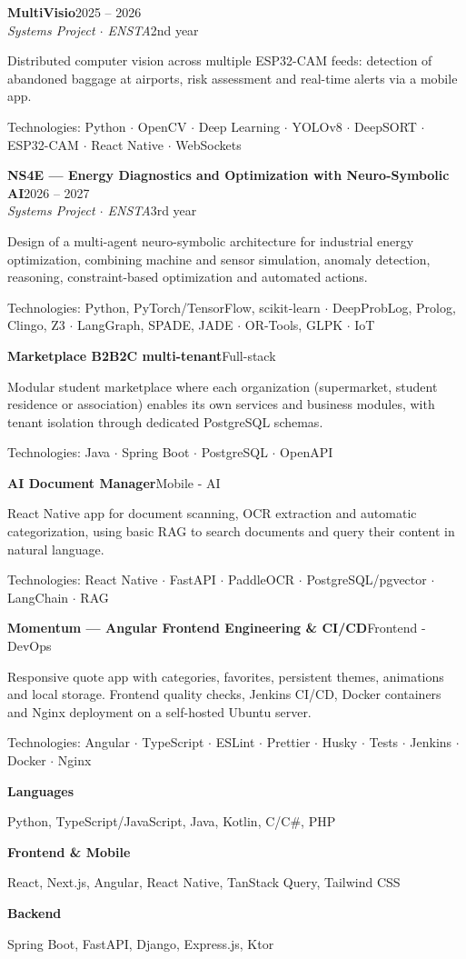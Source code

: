 \documentclass[9pt,a4paper]{extarticle}
\newcommand{\sectioncv}[1]{\vspace{5pt}{\bfseries\color{accent}\fontsize{10}{11}\selectfont #1}\par\vspace{1pt}{\color{accent}\rule{\linewidth}{0.55pt}}\vspace{2pt}}
\newcommand{\job}[4]{\textbf{#1}\hfill{\color{muted}\footnotesize #3}\\[-2pt]{\color{accent}\itshape #2}\hfill{\color{muted}\footnotesize #4}\par\vspace{1pt}}
\newcommand{\project}[2]{\textbf{#1}\hfill{\color{muted}\footnotesize #2}\par\vspace{1pt}}
\newcommand{\tech}[1]{{\footnotesize\color{accent}#1}\par}
\newcommand{\skill}[2]{\textbf{#1}\par{\color{muted}#2}\par\vspace{2pt}}
\begin{document}
\vspace{2pt}
\job{MultiVisio}{Systems Project $\cdot$ ENSTA}{2025 -- 2026}{2nd year}
Distributed computer vision across multiple ESP32-CAM feeds: detection of abandoned baggage at airports, risk assessment and real-time alerts via a mobile app.\par
\tech{Technologies: Python $\cdot$ OpenCV $\cdot$ Deep Learning $\cdot$ YOLOv8 $\cdot$ DeepSORT $\cdot$ ESP32-CAM $\cdot$ React Native $\cdot$ WebSockets}
\vspace{2pt}
\job{NS4E --- Energy Diagnostics and Optimization with Neuro-Symbolic AI}{Systems Project $\cdot$ ENSTA}{2026 -- 2027}{3rd year}
 Design of a multi-agent neuro-symbolic architecture for industrial energy optimization, combining machine and sensor simulation, anomaly detection, reasoning, constraint-based optimization and automated actions.\par
\tech{Technologies: Python, PyTorch/TensorFlow, scikit-learn $\cdot$ DeepProbLog, Prolog, Clingo, Z3 $\cdot$ LangGraph, SPADE, JADE $\cdot$ OR-Tools, GLPK $\cdot$ IoT}
\sectioncv{PROJECTS}
\project{Marketplace B2B2C multi-tenant}{Full-stack}
 Modular student marketplace where each organization (supermarket, student residence or association) enables its own services and business modules, with tenant isolation through dedicated PostgreSQL schemas.\par
\tech{Technologies: Java $\cdot$ Spring Boot $\cdot$ PostgreSQL $\cdot$ OpenAPI}
\vspace{3pt}
\project{AI Document Manager}{Mobile - AI}
 React Native app for document scanning, OCR extraction and automatic categorization, using basic RAG to search documents and query their content in natural language.\par
\tech{Technologies: React Native $\cdot$ FastAPI $\cdot$ PaddleOCR $\cdot$ PostgreSQL/pgvector $\cdot$ LangChain $\cdot$ RAG}
\vspace{3pt}
\project{Momentum --- Angular Frontend Engineering \& CI/CD}{Frontend  - DevOps}
{\color{muted} Responsive quote app with categories, favorites, persistent themes, animations and local storage. Frontend quality checks, Jenkins CI/CD, Docker containers and Nginx deployment on a self-hosted Ubuntu server.}\par
\tech{Technologies: Angular $\cdot$ TypeScript $\cdot$ ESLint $\cdot$ Prettier $\cdot$ Husky $\cdot$ Tests $\cdot$ Jenkins $\cdot$ Docker $\cdot$ Nginx}
\sectioncv{TECHNICAL SKILLS}
\begin{minipage}[t]{0.485\linewidth}\raggedright
\skill{Languages}{Python, TypeScript/JavaScript, Java, Kotlin, C/C\#, PHP}
\skill{Frontend \& Mobile}{React, Next.js, Angular, React Native, TanStack Query, Tailwind CSS}
\skill{Backend}{Spring Boot, FastAPI, Django, Express.js, Ktor}
\end{minipage}\hfill
\end{document}
